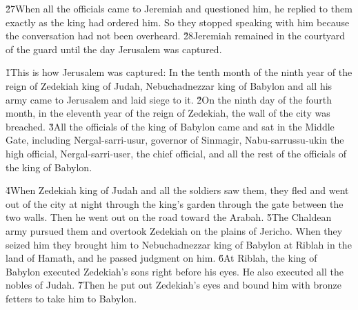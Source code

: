 \v{27}When all the officials came to Jeremiah and questioned him, he replied to them exactly as the king had ordered him. So they stopped speaking with him because the conversation had not been overheard. \v{28}Jeremiah remained in the courtyard of the guard until the day Jerusalem was captured.

\v{1}This is how Jerusalem was captured: In the tenth month of the ninth year of the reign of Zedekiah king of Judah, Nebuchadnezzar king of Babylon and all his army came to Jerusalem and laid siege to it. \v{2}On the ninth day of the fourth month, in the eleventh year of the reign of Zedekiah, the wall of the city was breached. \v{3}All the officials of the king of Babylon came and sat in the Middle Gate, including Nergal-sarri-usur, governor of Sinmagir, Nabu-sarrussu-ukin the high official, Nergal-sarri-user, the chief official, and all the rest of the officials of the king of Babylon.

\v{4}When Zedekiah king of Judah and all the soldiers saw them, they fled and went out of the city at night through the king's garden through the gate between the two walls. Then he went out on the road toward the Arabah. \v{5}The Chaldean army pursued them and overtook Zedekiah on the plains of Jericho. When they seized him they brought him to Nebuchadnezzar king of Babylon at Riblah in the land of Hamath, and he passed judgment on him. \v{6}At Riblah, the king of Babylon executed Zedekiah's sons right before his eyes. He also executed all the nobles of Judah. \v{7}Then he put out Zedekiah's eyes and bound him with bronze fetters to take him to Babylon.

